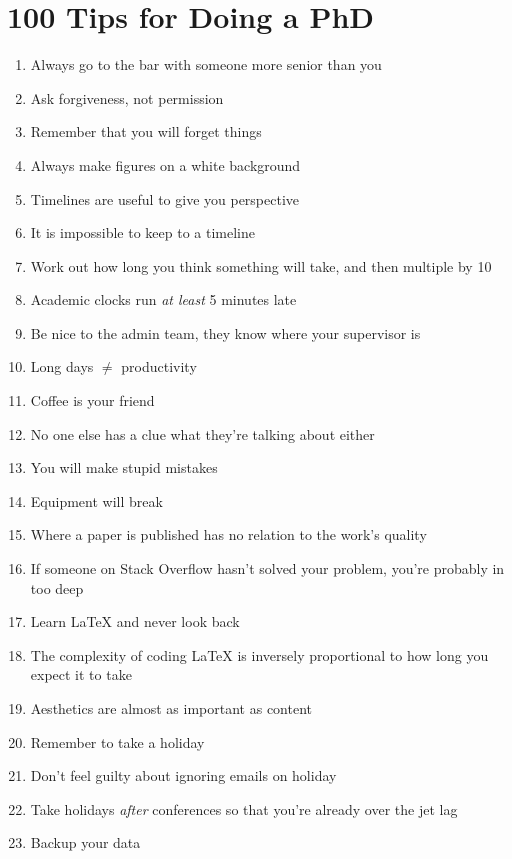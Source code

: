 %
%

\chapter{100 Tips for Doing a PhD}
\label{app:app01}

\begin{enumerate}
	\item Always go to the bar with someone more senior than you
	\item Ask forgiveness, not permission
	\item Remember that you will forget things
	\item Always make figures on a white background
	\item Timelines are useful to give you perspective
	\item It is impossible to keep to a timeline
	\item Work out how long you think something will take, and then multiple by 10 \cite{Hofstadter}
	\item Academic clocks run \emph{at least} 5 minutes late
	\item Be nice to the admin team, they know where your supervisor is
	\item Long days $\ne$ productivity
	\item Coffee is your friend
	\item No one else has a clue what they're talking about either
	\item You will make stupid mistakes
	\item Equipment will break
	\item Where a paper is published has no relation to the work's quality
	\item If someone on Stack Overflow hasn't solved your problem, you're probably in too deep
	\item Learn \LaTeX{} and never look back
	\item The complexity of coding \LaTeX{} is inversely proportional to how long you expect it to take
	\item Aesthetics are almost as important as content
	\item Remember to take a holiday
	\item Don't feel guilty about ignoring emails on holiday
	\item Take holidays \emph{after} conferences so that you're already over the jet lag
	\item Backup your data

\end{enumerate}

